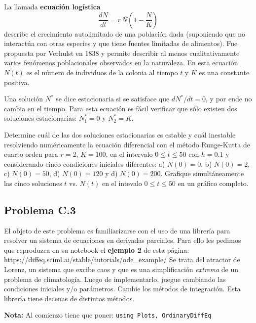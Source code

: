 \documentclass[11pt]{article}
\begin{document}
La llamada \textbf{ecuación logística} \[
\frac{dN}{dt}= r\,N \left(1-\frac{N}{K}\right)
\] describe el crecimiento autolimitado de una población dada
(suponiendo que no interactúa con otras especies y que tiene fuentes
limitadas de alimentos). Fue propuesta por Verhulst en 1838 y permite
describir al menos cualitativamente varios fenómenos poblacionales
observados en la naturaleza. En esta ecuación \(N(t)\) es el número de
individuos de la colonia al tiempo \(t\) y \(K\) es una constante
positiva.

Una solución \(N^*\) se dice estacionaria si se satisface que
\(dN^*/dt=0\), y por ende no cambia en el tiempo. Para esta ecuación es
fácil verificar que sólo existen dos soluciones estacionarias:
\(N_1^*=0\) y \(N_2^*=K\).

Determine cuál de las dos soluciones estacionarias es estable y cuál
inestable resolviendo numéricamente la ecuación diferencial con el
método Runge-Kutta de cuarto orden para \(r=2\), \(K=100\), en el
intervalo \(0\le t \le 50\) con \(h=0.1\) y considerando cinco
condiciones iniciales diferentes: a) \(N(0)= 0\), b) \(N(0)=2\), c)
\(N(0)=50\), d) \(N(0)= 120\) y d) \(N(0)=200\). Grafique
simultáneamente las cinco soluciones \(t\) vs. \(N(t)\) en el intevalo
\(0\le t\le 50\) en un gráfico completo.

    \hypertarget{problema-c.3}{%
\subsection*{Problema C.3}\label{problema-c.3}}

El objeto de este problema es familiarizarse con el uso de una librería
para resolver un sistema de ecuaciones en derivadas parciales. Para ello
les pedimos que reproduzca en su notebook el \textbf{ejemplo 2} de esta
página: https://diffeq.sciml.ai/stable/tutorials/ode\_example/ Se trata
del atractor de Lorenz, un sistema que excibe caos y que es una
simplificación \emph{extrema} de un problema de climatología. Luego de
implementarlo, juegue cambiando las condiciones iniciales y/o
parámetros. Cambie los métodos de integración. Esta librería tiene
decenas de distintos métodos.

\textbf{Nota:} Al comienzo tiene que poner:
\texttt{using\ Plots,\ OrdinaryDiffEq}


    
    
    
    
\end{document}
